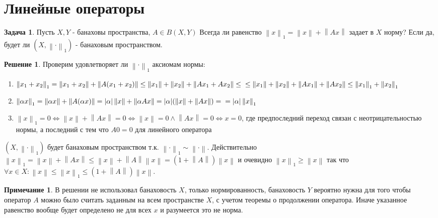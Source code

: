 \documentclass[12pt,a4paper]{article}
\theoremstyle{definition}
\newtheorem{exercise}{Задача}[section]
\newtheorem{solution}{Решение}[section]
\newtheorem{note}{Примечание}[section]
\newcommand{\norm}[1]{\left\lVert#1\right\rVert}
\begin{document}
	\section{Линейные операторы}
	
	\begin{exercise}
		Пусть $X,Y$ - банаховы пространства, $A\in B(X,Y)$ Всегда ли равенство $\norm{x}_1 = \norm{x} + \norm{Ax}$ задает в $X$ норму? Если да, будет ли $(X, \norm{\cdot}_1)$ - банаховым пространством.
	\end{exercise}
	\begin{solution}
		Проверим удовлетворяет ли $\norm{\cdot}_1$ аксиомам нормы:
		\begin{enumerate}
			\item $\norm{x_1 + x_2}_1 = \norm{x_1 + x_2} + \norm{A(x_1 + x_2)} \leq \norm{x_1} + \norm{x_2} + \norm{Ax_1 + Ax_2} \leq \newline
			\leq \norm{x_1} + \norm{x_2} + \norm{Ax_1} + \norm{Ax_2}
			\leq \norm{x_1}_1 + \norm{x_2}_1$
			
			\item $\norm{\alpha x}_1 = \norm{\alpha x} + \norm{A(\alpha x)} = |\alpha| \norm{x} + \norm{\alpha Ax} = |\alpha| (\norm{x} + \norm{Ax}) = \newline = |\alpha|\norm{x}_1$
			
			\item $\norm{x}_1 = 0 \Leftrightarrow \norm{x} + \norm{Ax} = 0 \Leftrightarrow \norm{x} = 0 \wedge \norm{Ax} = 0 \Leftrightarrow x = 0$, где предпоследний переход связан с неотрицательностью нормы, а последний с тем что $A0=0$ для линейного оператора
		\end{enumerate}
		$(X, \norm{\cdot}_1)$ будет банаховым пространством т.к. $\norm{\cdot}_1 \sim \norm{\cdot}$. Действительно $\norm{x}_1 = \norm{x} + \norm{Ax} \leq \norm{x} + \norm{A}\norm{x} = (1 + \norm{A})\norm{x}$ и очевидно $\norm{x}_1 \geq \norm{x}$ так что
		$\forall x\in X : \norm{x} \leq \norm{x}_1 \leq (1 + \norm{A})\norm{x}$.
	\end{solution}
	\begin{note}
		В решении не использовал банаховость $X$, только нормированность, банаховость $Y$ вероятно нужна для того чтобы оператор $A$ можно было считать заданным на всем пространстве $X$, с учетом теоремы о продолжении оператора. Иначе указанное равенство вообще будет определено не для всех $x$ и разумеется это не норма.
	\end{note}

	\newpage
	
\end{document}
